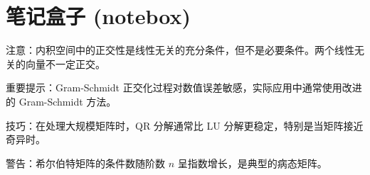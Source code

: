 \section{笔记盒子 (notebox)}

\begin{notebox}
注意：内积空间中的正交性是线性无关的充分条件，但不是必要条件。两个线性无关的向量不一定正交。
\end{notebox}

\begin{notebox}
重要提示：Gram-Schmidt 正交化过程对数值误差敏感，实际应用中通常使用改进的 Gram-Schmidt 方法。
\end{notebox}

\begin{notebox}
技巧：在处理大规模矩阵时，QR 分解通常比 LU 分解更稳定，特别是当矩阵接近奇异时。
\end{notebox}

\begin{notebox}
警告：希尔伯特矩阵的条件数随阶数 \( n \) 呈指数增长，是典型的病态矩阵。
\end{notebox}